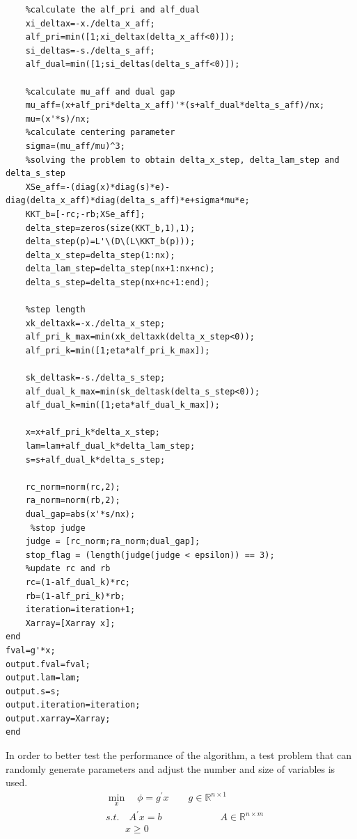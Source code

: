 {\begin{lstlisting}
    %calculate the alf_pri and alf_dual
    xi_deltax=-x./delta_x_aff;
    alf_pri=min([1;xi_deltax(delta_x_aff<0)]);
    si_deltas=-s./delta_s_aff;
    alf_dual=min([1;si_deltas(delta_s_aff<0)]);
    
    %calculate mu_aff and dual gap
    mu_aff=(x+alf_pri*delta_x_aff)'*(s+alf_dual*delta_s_aff)/nx;
    mu=(x'*s)/nx;
    %calculate centering parameter
    sigma=(mu_aff/mu)^3;
    %solving the problem to obtain delta_x_step, delta_lam_step and delta_s_step
    XSe_aff=-(diag(x)*diag(s)*e)-diag(delta_x_aff)*diag(delta_s_aff)*e+sigma*mu*e;
    KKT_b=[-rc;-rb;XSe_aff];
    delta_step=zeros(size(KKT_b,1),1);
    delta_step(p)=L'\(D\(L\KKT_b(p)));
    delta_x_step=delta_step(1:nx);
    delta_lam_step=delta_step(nx+1:nx+nc);
    delta_s_step=delta_step(nx+nc+1:end);
    
    %step length
    xk_deltaxk=-x./delta_x_step;
    alf_pri_k_max=min(xk_deltaxk(delta_x_step<0));
    alf_pri_k=min([1;eta*alf_pri_k_max]);
    
    sk_deltask=-s./delta_s_step;
    alf_dual_k_max=min(sk_deltask(delta_s_step<0));
    alf_dual_k=min([1;eta*alf_dual_k_max]);
    
    x=x+alf_pri_k*delta_x_step;
    lam=lam+alf_dual_k*delta_lam_step;
    s=s+alf_dual_k*delta_s_step;
    
    rc_norm=norm(rc,2);
    ra_norm=norm(rb,2);
    dual_gap=abs(x'*s/nx);
     %stop judge
    judge = [rc_norm;ra_norm;dual_gap];
    stop_flag = (length(judge(judge < epsilon)) == 3);
    %update rc and rb
    rc=(1-alf_dual_k)*rc;
    rb=(1-alf_pri_k)*rb;
    iteration=iteration+1;
    Xarray=[Xarray x];
end
fval=g'*x;
output.fval=fval;
output.lam=lam;
output.s=s;
output.iteration=iteration;
output.xarray=Xarray;
end
\end{lstlisting}}
In order to better test the performance of the algorithm, a test problem that can randomly generate parameters and adjust the number and size of variables is used.
\begin{align*}
&\min_{x} \quad \phi=g^{\prime} x \qquad g\in \mathbb{R}^{n \times 1} \tag{4.21}\label{con:op4.21}\\
& s.t. \quad A^{\prime}x=b \qquad \qquad \qquad A\in \mathbb{R}^{n \times m}\\
& \quad \quad  x\ge 0
\end{align*}

